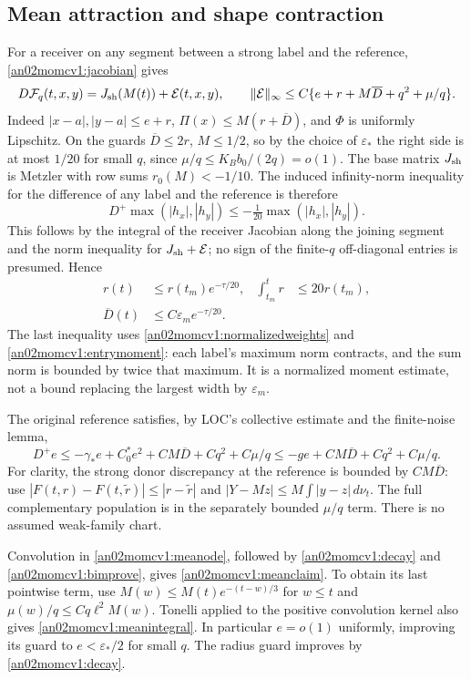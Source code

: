 \documentclass[11pt]{article}
\theoremstyle{remark}\newtheorem{remark}[theorem]{Remark}
\newcommand{\dd}{\,d}
\newcommand{\eps}{\varepsilon}
\begin{document}
\subsection{Mean attraction and shape contraction}
For a receiver on any segment between a strong label and the reference,
\eqref{an02momcv1:jacobian} gives
\begin{equation}\label{an02momcv1:jacdef}
 D\mathcal F_q(t,x,y)=J_{\rm sh}(M(t))+\mathcal E(t,x,y),\qquad
 \|\mathcal E\|_\infty
 \le C\{e+r+M\overline D+q^2+\mu/q\}.
\end{equation}
Indeed $|x-a|,|y-a|\le e+r$,
$\Pi(x)\le M(r+\overline D)$, and $\Phi$ is uniformly
Lipschitz. On the guards $\overline D\le2r$,
$M\le1/2$, so by the choice of $\eps_*$ the right side is at
most $1/20$ for small $q$, since
$\mu/q\le K_Bb_0/(2q)=o(1)$.
The base matrix $J_{\rm sh}$ is Metzler with row sums
$r_0(M)<-1/10$. The induced infinity-norm inequality for the
difference of any label and the reference is therefore
\[
 D^+\max(|h_x|,|h_y|)\le
 -\tfrac1{20}\max(|h_x|,|h_y|).
\]
This follows by the integral of the receiver Jacobian along the
joining segment and the norm inequality for $J_{\rm sh}+\mathcal E$;
no sign of the finite-$q$ off-diagonal entries is presumed.
Hence
\begin{align}
 r(t)&\le r(t_m)e^{-\tau/20},&
 \int_{t_m}^{t}r&\le20r(t_m),\nonumber\\
 \overline D(t)&\le C\eps_m e^{-\tau/20}.
 \label{an02momcv1:decay}
\end{align}
The last inequality uses \eqref{an02momcv1:normalizedweights}
and \eqref{an02momcv1:entrymoment}: each label's maximum norm
contracts, and the sum norm is bounded by twice that maximum.
It is a normalized moment estimate, not a bound replacing the
largest width by $\eps_m$.

The original reference satisfies, by LOC's collective estimate
and the finite-noise lemma,
\begin{equation}\label{an02momcv1:meanode}
 D^+e\le-\gamma_* e+C_0^*e^2
                    +C M\overline D+Cq^2+C\mu/q
 \le-ge+C M\overline D+Cq^2+C\mu/q .
\end{equation}
For clarity, the strong donor discrepancy at the reference is
bounded by $CM\overline D$: use
$|F(t,r)-F(t,\widetilde r)|\le|r-\widetilde r|$ and
$|Y-Mz|\le M\int|y-z|\dd\nu_t$.
The full complementary population is in the separately bounded
$\mu/q$ term. There is no assumed weak-family chart.

Convolution in \eqref{an02momcv1:meanode}, followed by
\eqref{an02momcv1:decay} and \eqref{an02momcv1:bimprove}, gives
\eqref{an02momcv1:meanclaim}. To obtain its last pointwise term,
use $M(w)\le M(t)e^{-(t-w)/3}$ for $w\le t$ and
$\mu(w)/q\le Cq\ell^2M(w)$.
Tonelli applied to the positive convolution kernel also gives
\eqref{an02momcv1:meanintegral}. In particular $e=o(1)$ uniformly,
improving its guard to $e<\eps_*/2$ for small $q$.
The radius guard improves by \eqref{an02momcv1:decay}.
\end{document}
